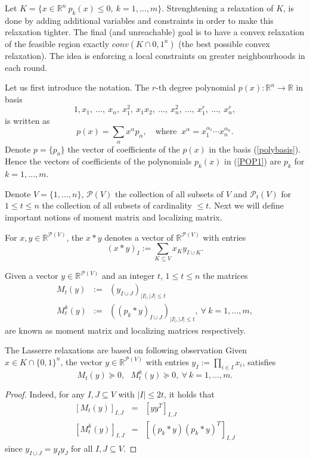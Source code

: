 \documentclass[12pt]{book}
\theoremstyle{definition}
\begin{document}
Let $K = \{ x\in \mathbb{R}^n \ p_k(x)\leq 0, \ k=1,\dots ,m \}$. Strenghtening a relaxation of $K$, is done by adding additional variables and constraints in order to make this relaxation tighter. The final (and unreachable) goal is to have a convex relaxation of the feasible region exactly $conv(K \cap {0,1}^n)$ (the best possible convex relaxation).  The idea is enforcing a local constraints on greater neighbourhoods in each round. 

Let us first introduce the notation. The $r$-th degree polynomial $p(x):\mathbb{R}^n\rightarrow\mathbb{R}$ in basis 
\begin{equation}
\label{polybasis}
1,x_1,\ \dots ,\ x_n,\ x_1^2,\ x_1x_2,\ \dots ,\ x_n^2,\ \dots ,\ x_1^r,\ \dots ,\ x_n^r,
\end{equation}
is written as 
$$p(x) = \sum_\alpha x^\alpha p_\alpha, \ \ \ \mbox{ where } \ x^\alpha = x_1^{\alpha_1}\cdots x_n^{\alpha_n}. $$
Denote $p = \{p_a\}$ the vector of coefficients of the $p(x)$ in the basis (\ref{polybasis}). Hence the vectors of coefficients of the polynomials $p_k(x)$ in (\ref{POP1}) are $p_k$ for $k=1,\dots ,m$.

Denote $V = \{ 1,\dots ,n\}$,  $\mathcal{P}(V)$ the collection of all subsets of $V$ and $\mathcal{P}_t(V)$ for $1\leq t\leq n$ the collection of all subsets of cardinality $\leq t$. 
Next we will define important notions of moment matrix and localizing matrix.


For $x,y\in \mathbb{R}^{\mathcal{P}(V)}$, the $x*y$ denotes a vector of $\mathbb{R}^{\mathcal{P}(V)}$
with entries 
\begin{equation}
(x*y)_I := \sum_{K\subseteq V} x_K y_{I\cup K}.
\end{equation}

Given a vector $y\in \mathbb{R}^{\mathcal{P}(V)}$  and an integer $t$, $1\leq t\leq n$
the matrices \begin{eqnarray}
M_t(y) &:=& (y_{I\cup J})_{\vert I\vert ,\vert J\vert \leq t} \\
M_t^k(y) &:=& \left((p_k*y)_{I\cup J}\right)_{\vert I\vert ,\vert J\vert \leq t} , \ \forall \ k=1,\dots ,m,
\end{eqnarray}
are known as moment matrix and localizing matrices respectively.

The Lasserre relaxations are based on following observation
\lema Given $x\in K\cap \{ 0,1\}^n$, the vector $y\in \mathbb{R}^{\mathcal{P}(V)}$ with entries $y_I:=\prod_{i\in I} x_i$, satisfies $$M_t(y)\succeq 0, \ \ \ M_t^k(y)\succeq 0, \ \forall \ k=1,\dots ,m.$$
\rm
\begin{proof}
Indeed, for any $I,J\subseteq V$ with $\vert I\vert \leq 2t$, it holds that
\begin{eqnarray*}
\left[M_t(y)\right]_{I,J} &=& [yy^T]_{I,J} \\
\left[M_t^k(y)\right]_{I,J} &=& \left[(p_k*y)(p_k*y)^T\right]_{I,J}
\end{eqnarray*}
since $y_{I\cup J} = y_I y_J$ for all $I,J\subseteq V$. 
\end{proof}
\end{document}
